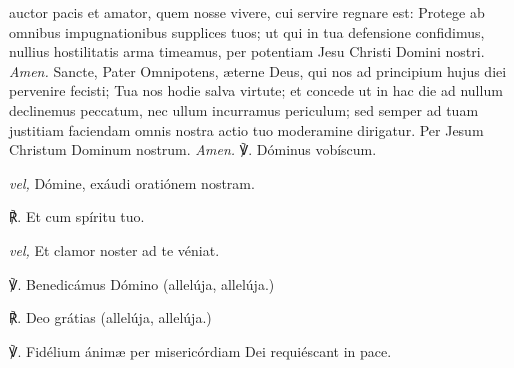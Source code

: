 \vspace{-2ex}
 auctor pacis et amator, quem nosse vivere, cui servire regnare est: Protege ab omnibus impugnationibus supplices tuos; ut qui in tua defensione confidimus, nullius hostilitatis arma timeamus, per potentiam Jesu Christi Domini nostri. \textit{Amen.}
 Sancte, Pater Omnipotens, æterne Deus, qui nos ad principium hujus diei pervenire fecisti; Tua nos hodie salva virtute; et concede ut in hac die ad nullum declinemus peccatum, nec ullum incurramus periculum; sed semper ad tuam justitiam faciendam omnis nostra actio tuo moderamine dirigatur. Per Jesum Christum Dominum nostrum. \textit{Amen.}
℣. Dóminus vobíscum.\par
\textit{vel,} Dómine, exáudi oratiónem nostram.

℟. Et cum spíritu tuo.\par
\textit{vel,} Et clamor noster ad te véniat.

℣. Benedicámus Dómino (allelúja, allelúja.)

℟. Deo grátias (allelúja, allelúja.)

℣. Fidélium ánim{\ae} {} per misericórdiam Dei requiéscant in pace.

